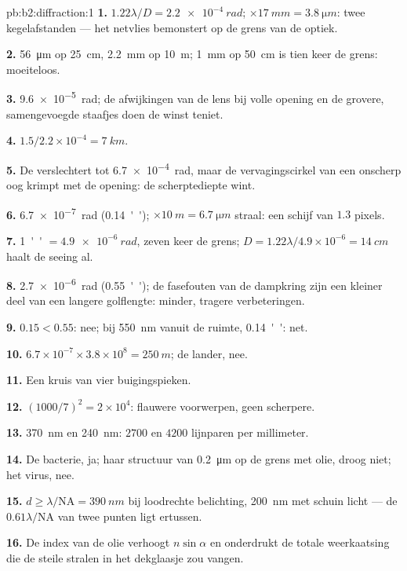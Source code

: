 \begin{solution}{pb:b2:diffraction:1}
\textbf{1.} $1.22\lambda/D = \qty{2.2e-4}{rad}$;
$\times\qty{17}{mm} = \qty{3.8}{\micro m}$: twee
kegelafstanden --- het netvlies bemonstert op de grens van de optiek.

\textbf{2.} \qty{56}{\micro m} op \qty{25}{cm}, \qty{2.2}{mm} op
\qty{10}{m}; \qty{1}{mm} op
\qty{50}{cm} is tien keer de grens: moeiteloos.

\textbf{3.} \qty{9.6e-5}{rad}; de afwijkingen van de lens bij volle opening en de
grovere, samengevoegde staafjes doen de winst teniet.

\textbf{4.} $1.5/2.2 \times 10^{-4} = \qty{7}{km}$.

\textbf{5.} De  verslechtert tot \qty{6.7e-4}{rad}, maar de
vervagingscirkel van
een onscherp oog krimpt met de opening: de scherptediepte wint.

\textbf{6.} \qty{6.7e-7}{rad} (\qty{0.14}{''});
$\times\qty{10}{m} = \qty{6.7}{\micro m}$ straal: een
schijf van $1.3$ pixels.

\textbf{7.} \qty{1}{''} $= \qty{4.9e-6}{rad}$, zeven keer de grens;
$D = 1.22\lambda/4.9
\times 10^{-6} = \qty{14}{cm}$ haalt de seeing al.

\textbf{8.} \qty{2.7e-6}{rad} (\qty{0.55}{''}); de fasefouten van de dampkring zijn
een kleiner deel van een langere golflengte: minder, tragere verbeteringen.

\textbf{9.} $0.15 < 0.55$: nee; bij \qty{550}{nm} vanuit de ruimte,
\qty{0.14}{''}: net.

\textbf{10.} $6.7 \times 10^{-7} \times 3.8 \times 10^8 = \qty{250}{m}$; de
lander, nee.

\textbf{11.} Een kruis van vier buigingspieken.

\textbf{12.} $(1000/7)^2 = 2 \times 10^4$: flauwere voorwerpen, geen scherpere.

\textbf{13.} \qty{370}{nm} en \qty{240}{nm}: $2700$ en $4200$ lijnparen per
millimeter.

\textbf{14.} De bacterie, ja; haar structuur van \qty{0.2}{\micro m} op de grens
met olie, droog niet; het virus, nee.

\textbf{15.} $d \ge \lambda/\mathrm{NA} = \qty{390}{nm}$ bij loodrechte
belichting, \qty{200}{nm}
met schuin licht --- de $0.61\lambda/\mathrm{NA}$ van twee punten ligt ertussen.

\textbf{16.} De index van de olie verhoogt $n\sin\alpha$ en onderdrukt de totale
weerkaatsing die de steile stralen in het dekglaasje zou vangen.


\end{solution}
